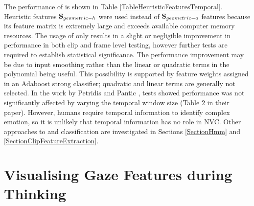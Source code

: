 
The performance of \temporalFeatPlural{ }is shown in Table \ref{TableHeuristicFeaturesTemporal}. Heuristic features $\textbf{S}_{geometric-h}$ were used instead of $\textbf{S}_{geometric-a}$ features because its feature matrix is extremely large and exceeds available computer memory resources. The usage of \temporalFeatPlural{ }only results in a slight or negligible improvement in performance in both clip and frame level testing, however further tests are required to establish statistical significance. 
The performance improvement may be due to input smoothing rather than the linear or quadratic terms in the polynomial being useful. This possibility is supported by feature weights assigned in an Adaboost strong classifier; quadratic and linear terms are generally not selected. In the work by Petridis and Pantic \cite{Petridis2008}, tests showed performance was not significantly affected by varying the temporal window size (Table 2 in their paper). However, humans require temporal information to identify complex emotion, so it is unlikely that temporal information has no role in \ac{NVC}. Other approaches to \temporalFeatPlural{ }and classification are investigated in Sections \ref{SectionHmm} and \ref{SectionClipFeatureExtraction}.






\section{Visualising Gaze Features during Thinking}
\label{SectionVisualisingGaze}


